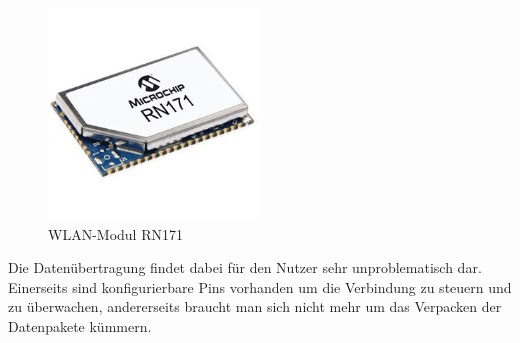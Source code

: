     \begin{figure}[tbh]
      \begin{centering}
        \includegraphics[width = 0.5\textwidth]{Bilder/RN171}
      \par\end{centering}
      \caption[WLAN-Modul RN171]{WLAN-Modul RN171\cite{RN171}}
      \label{RN171}
    \end{figure}

    Die Datenübertragung findet dabei für den Nutzer sehr unproblematisch dar. Einerseits sind konfigurierbare Pins vorhanden um die Verbindung zu steuern und zu überwachen,
    andererseits braucht man sich nicht mehr um das Verpacken der Datenpakete kümmern.


